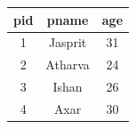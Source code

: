 \begin{tabular}{|c|c|c|}
\hline
pid & pname & age \\ \hline
1 & Jasprit & 31 \\
2 & Atharva & 24 \\
3 & Ishan & 26 \\
4 & Axar & 30 \\ \hline
\end{tabular}
